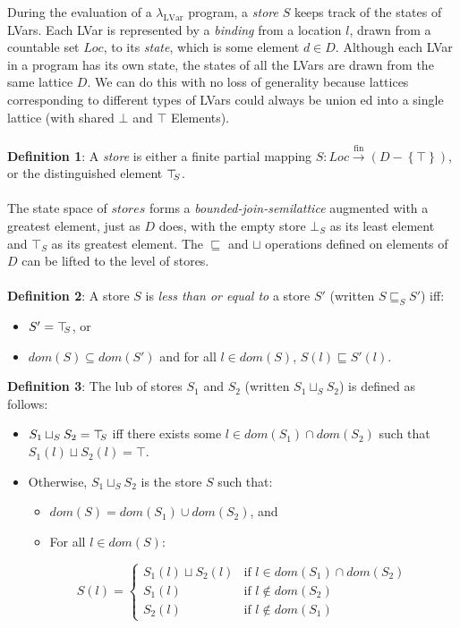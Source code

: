 \documentclass[twocolumn]{article}
\newcommand{\lambdaLVar}{\ensuremath{\lambda_{\textrm{LVar}}}}
\newcommand{\userleq}{\ensuremath{\sqsubseteq}}
\newcommand{\Loc}{\mathit{Loc}}
\newcommand{\fmap}{\ensuremath{\stackrel{\textrm{fin}}{\rightarrow}}}
\newcommand{\setof}[1]{\left\{#1\right\}}
\newcommand{\topS}{\ensuremath{\top\hspace{-0.85mm}_{S}}}
\newcommand{\leqstore}[2]{\ensuremath{#1 \userleq_S #2}}
\newcommand{\dom}[1]{\ensuremath{\mathit{dom}(#1)}}
\newcommand{\userlub}[2]{\ensuremath{#1 \sqcup #2}}
\newcommand{\lubstore}[2]{\ensuremath{#1 \sqcup_{S} #2}}
\begin{document}
During the evaluation of a $\lambdaLVar$ program, a \emph{store} $S$ keeps track of the states of LVars. Each LVar is represented by a \emph{binding} from a location \emph{$l$}, drawn from a countable set $\Loc$, to its \emph{state}, which is some element $d \in D$. Although each LVar in a program has its own state, the states of all the LVars are drawn from the same lattice $D$. We can do this with no loss of generality because lattices corresponding to different types of LVars could always be union ed into a single lattice (with shared $\bot$ and $\top$ Elements). \\ \\
\textbf{Definition 1}: A \emph{store} is either a finite partial mapping $S : \Loc \fmap (D - \setof{\top})$, or the distinguished element $\topS$. \\ \\
The state space of $stores$ forms a \emph{bounded-join-semilattice} augmented with a greatest element, just as $D$ does, with the empty store $\bot_S$ as its least element and $\top_S$ as its greatest element. The $\userleq$ and $\sqcup$ operations defined on elements of $D$ can be lifted to the level of stores.\\ \\
\textbf{Definition 2}: 
 A store $S$ is \emph{less than or equal to} a store $S'$ (written
$\leqstore{S}{S'}$) iff:
\begin{itemize}
\item $S' = \topS$, or
\item $\dom{S} \subseteq \dom{S'}$ and for all $l
\in \dom{S}$, $S(l) \userleq S'(l)$.
\end{itemize}
\textbf{Definition 3}:  The lub of stores $S_1$ and $S_2$ (written $\lubstore{S_1}{S_2}$) is
defined as follows:
\begin{itemize}
\item $\lubstore{S_1}{S_2} = \topS$ iff there exists some $l \in
\dom{S_1} \cap \dom{S_2}$ such that $\userlub{S_1(l)}{S_2(l)} = \top$.
\item Otherwise, $\lubstore{S_1}{S_2}$ is the store $S$ such that:
\begin{itemize}
\item $\dom{S} = \dom{S_1} \cup \dom{S_2}$, and
\item For all $l \in \dom{S}$:
\end{itemize}
\begin{displaymath}
S(l) = \left\{ \begin{array}{ll}
\userlub{S_1(l)}{S_2(l)} & \textrm{if $l \in \dom{S_1} \cap \dom{S_2}$} \\
S_1(l) & \textrm{if $l \notin \dom{S_2}$} \\
S_2(l) & \textrm{if $l \notin \dom{S_1}$}
\end{array} \right.
\end{displaymath}
\end{itemize}
\end{document}
